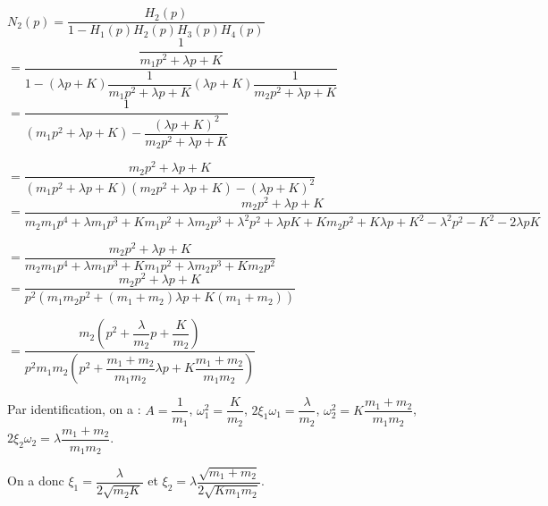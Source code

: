 \documentclass[10pt,fleqn]{article} %
\begin{document}
\subparagraph{}

$N_2(p)=\dfrac{H_2(p)}{1-H_1(p)H_2(p) H_3(p)H_4(p)}$ 
$= \dfrac{\dfrac{1}{m_1p^2  + \lambda p+K}}{1-\left(\lambda p+K\right)\dfrac{1}{m_1p^2  + \lambda p+K} \left(\lambda p+K\right)\dfrac{1}{m_2p^2  + \lambda p+K}}$
$= \dfrac{1}{\left(m_1p^2  + \lambda p+K\right)- \dfrac{\left(\lambda p+K\right)^2}{m_2p^2  + \lambda p+K}}$

$= \dfrac{m_2p^2  + \lambda p+K}{\left(m_1p^2  + \lambda p+K\right)\left(m_2p^2  + \lambda p+K\right)- \left(\lambda p+K\right)^2}$
$= \dfrac{m_2p^2  + \lambda p+K}{
m_2m_1p^4  + \lambda m_1p^3+Km_1p^2+\lambda m_2p^3  + \lambda^2 p^2 +\lambda pK+Km_2p^2  + K\lambda p+K^2 - \lambda^2 p^2 -K^2 - 2\lambda p K}$

$= \dfrac{m_2p^2  + \lambda p+K}{
m_2m_1p^4  + \lambda m_1p^3+Km_1p^2+\lambda m_2p^3   +Km_2p^2 }$
$= \dfrac{m_2p^2  + \lambda p+K}{
p^2\left( m_1m_2p^2  + \left(m_1+ m_2\right) \lambda p  +K\left(m_1+m_2\right)\right) }$

$= \dfrac{m_2\left(p^2  + \dfrac{\lambda}{m_2}p+\dfrac{K}{m_2}\right)}{
p^2 m_1m_2 \left(p^2  + \dfrac{m_1+ m_2}{m_1m_2} \lambda p  +K\dfrac{m_1+m_2}{m_1m_2}\right) }$

Par identification, on a : $A=\dfrac{1}{m_1}$, $\omega_1^2=\dfrac{K}{m_2}$, $2\xi_1\omega_1=\dfrac{\lambda}{m_2}$, $\omega_2^2=K\dfrac{m_1+m_2}{m_1m_2}$, $2\xi_2\omega_2=\lambda\dfrac{m_1+ m_2}{m_1m_2}$. 

On a donc $\xi_1=\dfrac{\lambda}{2  \sqrt{m_2K}}$ et 
$\xi_2=\lambda\dfrac{\sqrt{m_1+ m_2}}{2\sqrt{Km_1m_2}}$.
\end{document}
